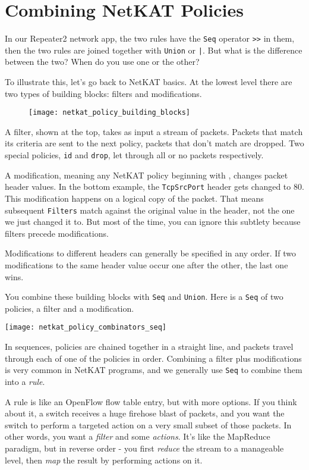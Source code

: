 \section{Combining NetKAT Policies}
\label{section:combining}

In our Repeater2 network app, the two rules have the \texttt{Seq} operator \texttt{>>} in them, then the two rules 
are joined together with \texttt{Union} or \texttt{|}.  
But what is the difference between the two?
When do you use one or the other?

To illustrate this, let's go back to NetKAT basics.  At the lowest level there are two types
of building blocks: filters and modifications.  

\begin{figure}[h]
\centering
\texttt{[image: netkat\_policy\_building\_blocks]}
\end{figure}

A filter, shown at the top, takes as input a stream of packets.  Packets that match its criteria are
sent to the next policy, packets that don't match are dropped.  Two special policies, 
\texttt{id} and \texttt{drop}, let through all or no packets respectively.  

A modification, meaning any NetKAT policy beginning with , 
changes packet header values.  In the bottom example, the \texttt{TcpSrcPort} header gets
changed to 80.  This modification happens on a logical copy of the packet.  That means subsequent \texttt{Filters} 
match against the original  
value in the header, not the one we just changed it to.  But most of the 
time, you can ignore this subtlety because filters precede modifications.

Modifications to different headers can generally be specified in any order.  If two modifications to the same header 
value occur one after the other, the last one wins. 

You combine these building blocks with \texttt{Seq} and \texttt{Union}.
Here is a \texttt{Seq} of two policies, a filter and a modification.   

\texttt{[image: netkat\_policy\_combinators\_seq]}

In sequences, policies
are chained together in a straight line, and packets travel through each of one of the policies in order.  
Combining a filter plus modifications is very common in NetKAT programs, and we generally
use \texttt{Seq} to combine them into a \emph{rule}.  

A rule is like an OpenFlow flow table entry, but with more options.  
If you think about it, a switch receives a huge firehose blast of packets, and you want the switch to 
perform a targeted action on a very small subset of those packets. 
In other words, you want a \emph{filter} and some \emph{actions}.
It's like the MapReduce paradigm, but in reverse order - you first \emph{reduce} the stream to a manageable level,
then \emph{map} the result by performing actions on it.  

